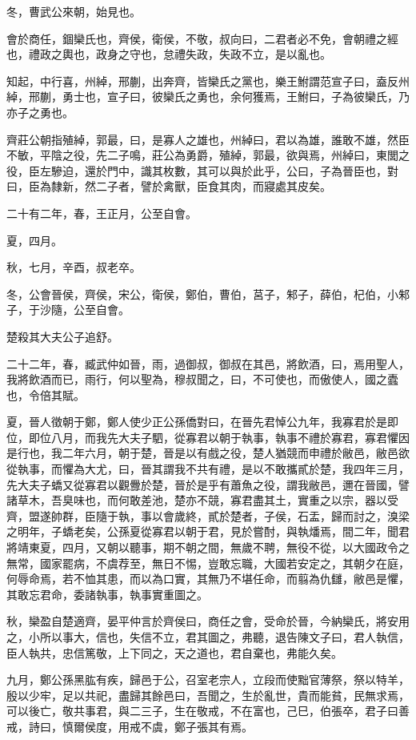\begin{pinyinscope}
冬，曹武公來朝，始見也。

會於商任，錮欒氏也，齊侯，衛侯，不敬，叔向曰，二君者必不免，會朝禮之經也，禮政之輿也，政身之守也，怠禮失政，失政不立，是以亂也。

知起，中行喜，州綽，邢蒯，出奔齊，皆欒氏之黨也，樂王鮒謂范宣子曰，盍反州綽，邢蒯，勇士也，宣子曰，彼欒氏之勇也，余何獲焉，王鮒曰，子為彼欒氏，乃亦子之勇也。

齊莊公朝指殖綽，郭最，曰，是寡人之雄也，州綽曰，君以為雄，誰敢不雄，然臣不敏，平陰之役，先二子鳴，莊公為勇爵，殖綽，郭最，欲與焉，州綽曰，東閭之役，臣左驂迫，還於門中，識其枚數，其可以與於此乎，公曰，子為晉臣也，對曰，臣為隸新，然二子者，譬於禽獸，臣食其肉，而寢處其皮矣。

二十有二年，春，王正月，公至自會。

夏，四月。

秋，七月，辛酉，叔老卒。

冬，公會晉侯，齊侯，宋公，衛侯，鄭伯，曹伯，莒子，邾子，薛伯，杞伯，小邾子，于沙隨，公至自會。

楚殺其大夫公子追舒。

二十二年，春，臧武仲如晉，雨，過御叔，御叔在其邑，將飲酒，曰，焉用聖人，我將飲酒而已，雨行，何以聖為，穆叔聞之，曰，不可使也，而傲使人，國之蠹也，令倍其賦。

夏，晉人徵朝于鄭，鄭人使少正公孫僑對曰，在晉先君悼公九年，我寡君於是即位，即位八月，而我先大夫子駟，從寡君以朝于執事，執事不禮於寡君，寡君懼因是行也，我二年六月，朝于楚，晉是以有戲之役，楚人猶競而申禮於敝邑，敝邑欲從執事，而懼為大尤，曰，晉其謂我不共有禮，是以不敢攜貳於楚，我四年三月，先大夫子蟜又從寡君以觀釁於楚，晉於是乎有蕭魚之役，謂我敝邑，邇在晉國，譬諸草木，吾臭味也，而何敢差池，楚亦不競，寡君盡其土，實重之以宗，器以受齊，盟遂帥群，臣隨于執，事以會歲終，貳於楚者，子侯，石盂，歸而討之，溴梁之明年，子蟜老矣，公孫夏從寡君以朝于君，見於嘗酎，與執燔焉，間二年，聞君將靖東夏，四月，又朝以聽事，期不朝之間，無歲不聘，無役不從，以大國政令之無常，國家罷病，不虞荐至，無日不惕，豈敢忘職，大國若安定之，其朝夕在庭，何辱命焉，若不恤其患，而以為口實，其無乃不堪任命，而翦為仇讎，敝邑是懼，其敢忘君命，委諸執事，執事實重圖之。

秋，欒盈自楚適齊，晏平仲言於齊侯曰，商任之會，受命於晉，今納欒氏，將安用之，小所以事大，信也，失信不立，君其圖之，弗聽，退告陳文子曰，君人執信，臣人執共，忠信篤敬，上下同之，天之道也，君自棄也，弗能久矣。

九月，鄭公孫黑肱有疾，歸邑于公，召室老宗人，立段而使黜官薄祭，祭以特羊，殷以少牢，足以共祀，盡歸其餘邑曰，吾聞之，生於亂世，貴而能貧，民無求焉，可以後亡，敬共事君，與二三子，生在敬戒，不在富也，己巳，伯張卒，君子曰善戒，詩曰，慎爾侯度，用戒不虞，鄭子張其有焉。


\end{pinyinscope}
